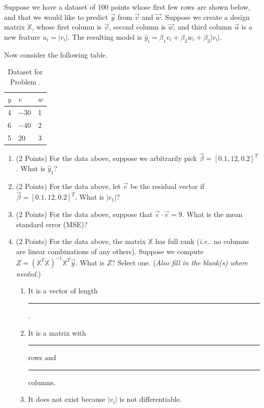 \documentclass{article}
\newcounter{problem}
\begin{document}
	\begin{problem}
		Suppose we have a dataset of 100 points whose first few rows are shown below, and that we would like to predict \(\vec{y}\) from \(\vec{v}\) and \(\vec{w}\). Suppose we create a design matrix \(\mathbb{X}\), whose first column is \(\vec{v}\), second column is \(\vec{w}\), and third column \(\vec{u}\) is a new feature \(u_i=|v_i|\). The resulting model is \(\hat{y}_i=\beta_1v_i+\beta_2w_i+\beta_3|v_i|\).
		
		Now consider the following table.
		
		\begin{table}[ht]
			\centering
			\begin{tabularx}{0.5\textwidth}{|X|X|X|}
				\hline
				\(y\)&\(v\)&\(w\)\\
				\hline
				4&\(-30\)&1\\
				6&\(-40\)&2\\
				5&20&3\\
				\hline
			\end{tabularx}
			\caption{Dataset for Problem \theproblem.}
		\end{table}
	
		\begin{enumerate}[label=(\alph*)]
			\item (2 Points) For the data above, suppose we arbitrarily pick \(\vec{\beta}=[0.1,12,0.2]^T\). What is \(\hat{y}_1\)?
			\item (2 Points) For the data above, let \(\vec{e}\) be the residual vector if \(\vec{\beta}=[0.1,12,0.2]^T\). What is \(|e_1|\)?
			\item (2 Points) For the data above, suppose that \(\vec{e}\cdot\vec{e}=9\). What is the mean standard error (MSE)?
			\item (2 Points) For the data above, the matrix \(\mathbb{X}\) has full rank (\textit{i.e.}. no columns are linear combinations of any others). Suppose we compute \(Z=(\mathbb{X}^T\mathbb{X})^{-1}\mathbb{X}^T\vec{y}\). What is \(Z\)? Select one. (\textit{Also fill in the blank(s) where needed}.)
			
			\begin{enumerate}[label=\Roman*.]
				\item It is a vector of length \rule{4em}{0.1px}.
				\item It is a matrix with \rule{4em}{0.1px} rows and \rule{4em}{0.1px} columns.
				\item It does not exist because \(|v_i|\) is not differentiable.
			\end{enumerate}
		\end{enumerate}
	\end{problem}
\end{document}
